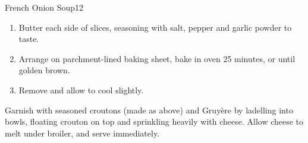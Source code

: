 \begin{recipe}{French Onion Soup}{}{12}
\begin{enumerate}
  \item Butter each side of slices, seasoning with salt, pepper and
    garlic powder to taste.
  \item Arrange on parchment-lined baking sheet, bake in oven 25
    minutes, or until golden brown.
  \item Remove and allow to cool slightly.
  \end{enumerate}
  \begin{note}
    Garnish with seasoned croutons (made as above) and Gruy\`ere by
    ladelling into bowls, floating crouton on top and sprinkling
    heavily with cheese.  Allow cheese to melt under broiler, and
    serve immediately.
  \end{note}
\end{recipe}

